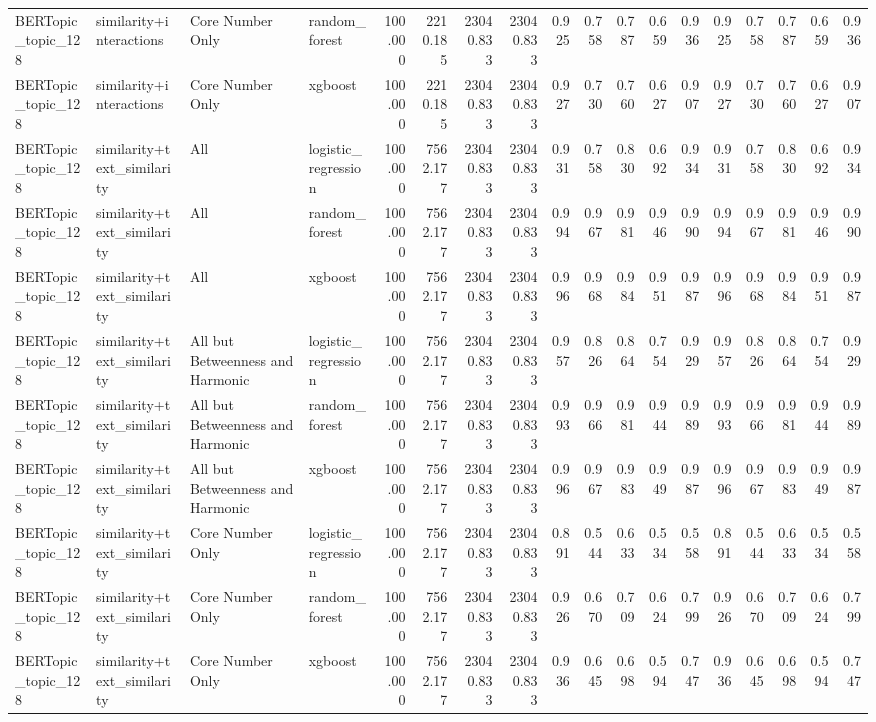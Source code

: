 \begin{tabular}{llllrrrrrrrrrrrrrr}
BERTopic_topic_128 & similarity+interactions & Core Number Only & random_forest & 100.000 & 2210.185 & 23040.833 & 23040.833 & 0.925 & 0.758 & 0.787 & 0.659 & 0.936 & 0.925 & 0.758 & 0.787 & 0.659 & 0.936 \\
BERTopic_topic_128 & similarity+interactions & Core Number Only & xgboost & 100.000 & 2210.185 & 23040.833 & 23040.833 & 0.927 & 0.730 & 0.760 & 0.627 & 0.907 & 0.927 & 0.730 & 0.760 & 0.627 & 0.907 \\
BERTopic_topic_128 & similarity+text_similarity & All & logistic_regression & 100.000 & 7562.177 & 23040.833 & 23040.833 & 0.931 & 0.758 & 0.830 & 0.692 & 0.934 & 0.931 & 0.758 & 0.830 & 0.692 & 0.934 \\
BERTopic_topic_128 & similarity+text_similarity & All & random_forest & 100.000 & 7562.177 & 23040.833 & 23040.833 & 0.994 & 0.967 & 0.981 & 0.946 & 0.990 & 0.994 & 0.967 & 0.981 & 0.946 & 0.990 \\
BERTopic_topic_128 & similarity+text_similarity & All & xgboost & 100.000 & 7562.177 & 23040.833 & 23040.833 & 0.996 & 0.968 & 0.984 & 0.951 & 0.987 & 0.996 & 0.968 & 0.984 & 0.951 & 0.987 \\
BERTopic_topic_128 & similarity+text_similarity & All but Betweenness and Harmonic & logistic_regression & 100.000 & 7562.177 & 23040.833 & 23040.833 & 0.957 & 0.826 & 0.864 & 0.754 & 0.929 & 0.957 & 0.826 & 0.864 & 0.754 & 0.929 \\
BERTopic_topic_128 & similarity+text_similarity & All but Betweenness and Harmonic & random_forest & 100.000 & 7562.177 & 23040.833 & 23040.833 & 0.993 & 0.966 & 0.981 & 0.944 & 0.989 & 0.993 & 0.966 & 0.981 & 0.944 & 0.989 \\
BERTopic_topic_128 & similarity+text_similarity & All but Betweenness and Harmonic & xgboost & 100.000 & 7562.177 & 23040.833 & 23040.833 & 0.996 & 0.967 & 0.983 & 0.949 & 0.987 & 0.996 & 0.967 & 0.983 & 0.949 & 0.987 \\
BERTopic_topic_128 & similarity+text_similarity & Core Number Only & logistic_regression & 100.000 & 7562.177 & 23040.833 & 23040.833 & 0.891 & 0.544 & 0.633 & 0.534 & 0.558 & 0.891 & 0.544 & 0.633 & 0.534 & 0.558 \\
BERTopic_topic_128 & similarity+text_similarity & Core Number Only & random_forest & 100.000 & 7562.177 & 23040.833 & 23040.833 & 0.926 & 0.670 & 0.709 & 0.624 & 0.799 & 0.926 & 0.670 & 0.709 & 0.624 & 0.799 \\
BERTopic_topic_128 & similarity+text_similarity & Core Number Only & xgboost & 100.000 & 7562.177 & 23040.833 & 23040.833 & 0.936 & 0.645 & 0.698 & 0.594 & 0.747 & 0.936 & 0.645 & 0.698 & 0.594 & 0.747 \\

\end{tabular}

